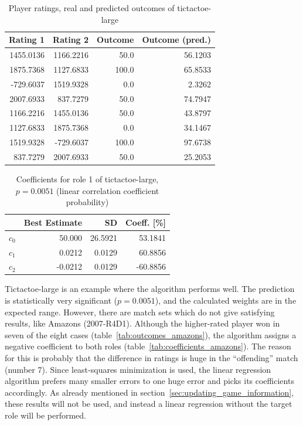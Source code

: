 \documentclass[a4paper,10pt]{article}
\begin{document}
\begin{table}[htp]
	\caption{Player ratings, real and predicted outcomes of tictactoe-large}
	\label{tab:outcomes_tictactoelarge}
	\begin{center}
		\begin{tabular}{rrrr}
			\hline
			\textbf{Rating 1} & \textbf{Rating 2} & \textbf{Outcome} & \textbf{Outcome (pred.)} \\
			\hline
			1455.0136    &	1166.2216    &	50.0         &	56.1203 \\
			1875.7368    &	1127.6833    &	100.0        &	65.8533 \\
			-729.6037    &	1519.9328    &	0.0          &	2.3262  \\
			2007.6933    &	837.7279     &	50.0         &	74.7947 \\
			1166.2216    &	1455.0136    &	50.0         &	43.8797 \\
			1127.6833    &	1875.7368    &	0.0          &	34.1467 \\
			1519.9328    &	-729.6037    &	100.0        &	97.6738 \\
			837.7279     &	2007.6933    &	50.0         &	25.2053 \\
			\hline
		\end{tabular}
	\end{center}
\end{table}

\begin{table}[htp]
	\caption{Coefficients for role 1 of tictactoe-large, $p = 0.0051$ (linear
correlation coefficient probability)}
	\label{tab:coefficients_tictactoelarge}
	\begin{center}
		\begin{tabular}{rrrr}
			\hline
			& \textbf{Best Estimate} & \textbf{SD} & \textbf{Coeff. [\%]} \\ 
			\hline
			$c_0$   &	50.000       &	26.5921      &	53.1841 \\
			$c_1$   &	0.0212       &	0.0129       &	60.8856 \\
			$c_2$   &	-0.0212      &	0.0129       &	-60.8856 \\
			\hline
		\end{tabular}
	\end{center}
\end{table}

Tictactoe-large is an example where the algorithm performs well. The prediction
is statistically very significant ($p = 0.0051$), and the calculated weights are
in the expected range. However, there are match sets which do not give
satisfying results, like Amazons (2007-R4D1). Although the higher-rated player
won in seven of the eight cases (table~\ref{tab:outcomes_amazons}), the
algorithm assigns a negative coefficient to both roles
(table~\ref{tab:coefficients_amazons}). The reason for this is probably that the
difference in ratings is huge in the ``offending'' match (number 7). Since
least-squares minimization is used, the linear regression algorithm prefers many
smaller errors to one huge error and picks its coefficients accordingly. As
already mentioned in section~\ref{sec:updating_game_information}, these results
will not be used, and instead a linear regression without the target role will
be performed.
\end{document}
